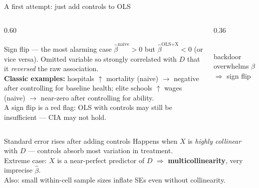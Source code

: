 \documentclass[aspectratio=169, 10pt]{beamer}
\begin{document}
\begin{frame}[shrink=3]{A first attempt: just add controls to OLS}
\begin{overprint}
    \begin{columns}[T]
      \begin{column}{0.60\textwidth}
        \begin{alertblock}{Sign flip — the most alarming case}
          $\hat\beta^{\text{naive}} > 0$ but $\hat\beta^{\text{OLS+X}} < 0$ (or vice versa).
          Omitted variable so strongly correlated with $D$ that it \emph{reversed} the raw association.\\[2pt]
          \textbf{Classic examples:} hospitals $\uparrow$ mortality (naive) $\to$ negative after controlling for baseline health; elite schools $\uparrow$ wages (naive) $\to$ near-zero after controlling for ability.\\[2pt]
          \alert{A sign flip is a red flag: OLS with controls may still be insufficient — CIA may not hold.}
        \end{alertblock}
      \end{column}
      \begin{column}{0.36\textwidth}
        \centering\vspace{4pt}
        \\[3pt]
        {\scriptsize\color{ecred} backdoor overwhelms $\beta$ $\Rightarrow$ sign flip}
      \end{column}
    \end{columns}

    \begin{alertblock}{Standard error rises after adding controls}
      Happens when $X$ is \emph{highly collinear} with $D$ — controls absorb most variation in treatment.\\[3pt]
      Extreme case: $X$ is a near-perfect predictor of $D$ $\Rightarrow$ \textbf{multicollinearity}, very imprecise $\hat\beta$.\\
      Also: small within-cell sample sizes inflate SEs even without collinearity.
    \end{alertblock}


\end{overprint}
\end{frame}
\end{document}
